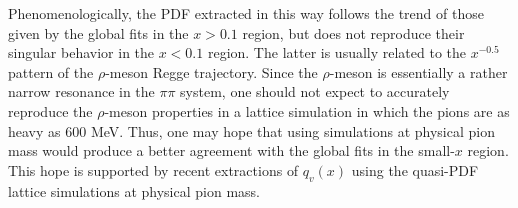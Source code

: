       Phenomenologically,
    the  PDF extracted in this way  follows the trend of  those
    given by the   global fits in the $x>0.1$ region,  but
    does not reproduce their  singular behavior in the $x<0.1$ region.
    The latter is usually related to the $x^{-0.5}$ pattern of the $\rho$-meson
    Regge trajectory. Since the $\rho$-meson is essentially a rather narrow
    resonance in the $\pi \pi$ system,
    one should not expect to accurately reproduce the $\rho$-meson
    properties  in a lattice simulation in which the pions
    are as heavy as 600 MeV.  Thus,  one may hope  that using simulations
    at physical pion mass would produce a better agreement with the global fits in the
    small-$x$ region.  This hope is supported by recent extractions  \cite{Alexandrou:2018pbm,Chen:2018xof}
    of $q_v (x)$ using  the quasi-PDF lattice simulations at physical pion mass.
